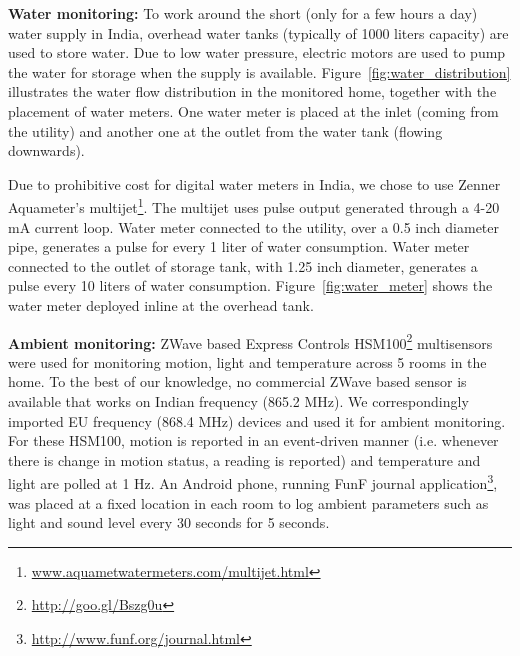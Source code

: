 \documentclass[10pt]{sensys-proc}
\newcommand{\figref}[1]{Figure~\ref{#1}}
\begin{document}
\noindent \textbf{Water monitoring:} 
To work around the short (only for a few hours a day) water supply in India, overhead water tanks (typically of 1000 liters capacity) are used to store water. Due to low water pressure, electric motors are used to pump the water for storage when the supply is available. %
\figref{fig:water_distribution} illustrates the water flow distribution in the monitored home, together with the placement of water meters. One water meter is placed at the inlet (coming from the utility) and another one at the outlet from the water tank (flowing downwards). %

Due to prohibitive cost for digital water meters in India, we chose to use Zenner Aquameter's multijet\footnote{\url{www.aquametwatermeters.com/multijet.html}}. The multijet uses pulse output generated through a 4-20 mA current loop. 
Water meter connected to the utility, over a 0.5 inch diameter pipe, generates a pulse for every 1 liter of water consumption. Water meter connected to the outlet of storage tank, with 1.25 inch diameter, generates a pulse every 10 liters of water consumption. %
\figref{fig:water_meter} shows the water meter deployed inline at the overhead tank.

\noindent \textbf{Ambient monitoring:} ZWave based Express Controls HSM100\footnote{\url{http://goo.gl/Bszg0u}} multisensors were used for monitoring motion, light and temperature across 5 rooms in the home. To the best of our knowledge, no commercial ZWave based sensor is available that works on Indian frequency (865.2 MHz). We correspondingly imported EU frequency (868.4 MHz) devices and used it for ambient monitoring. For these HSM100, motion is reported in an event-driven manner (i.e. whenever there is change in motion status, a reading is reported) and temperature and light are polled at 1 Hz. An Android phone, running FunF journal application\footnote{\url{http://www.funf.org/journal.html}}, was placed at a fixed location in each room to log ambient parameters such as light and sound level every 30 seconds for 5 seconds.
\end{document}

